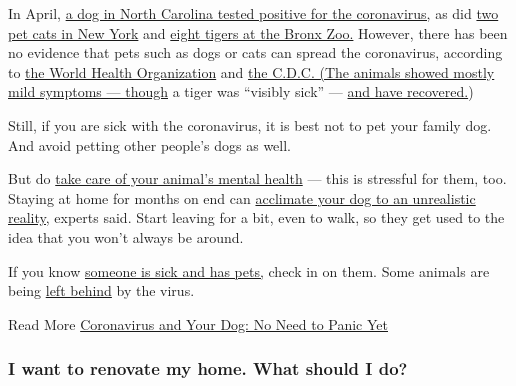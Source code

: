 In April,
\href{https://www.nytimes.com/2020/04/28/us/dog-coronavirus-positive-test.html}{a
dog in North Carolina tested positive for the coronavirus,} as did
\href{https://www.nytimes.com/2020/04/22/health/cats-pets-coronavirus.html}{two
pet cats in New York} and
\href{https://newsroom.wcs.org/News-Releases/articleType/ArticleView/articleId/14084/Update-Bronx-Zoo-Tigers-and-Lions-Recovering-from-COVID-19.aspx}{eight
tigers at the Bronx Zoo.} However, there has been no evidence that pets
such as dogs or cats can spread the coronavirus, according to
\href{https://www.who.int/docs/default-source/inaugural-who-partners-forum/coronavirus-poster-english-srilanka.pdf?sfvrsn=289dedc3_0}{the
World Health Organization} and
\href{https://www.cdc.gov/coronavirus/2019-ncov/daily-life-coping/animals.html?CDC_AA_refVal=https\%3A\%2F\%2Fwww.cdc.gov\%2Fcoronavirus\%2F2019-ncov\%2Fprepare\%2Fanimals.html}{the
C.D.C. (The animals showed mostly mild symptoms --- though} a tiger was
``visibly sick'' ---
\href{https://www.cdc.gov/coronavirus/2019-ncov/daily-life-coping/animals.html?CDC_AA_refVal=https\%3A\%2F\%2Fwww.cdc.gov\%2Fcoronavirus\%2F2019-ncov\%2Fprepare\%2Fanimals.html}{and
have recovered.})

Still, if you are sick with the coronavirus, it is best not to pet your
family dog. And avoid petting other people's dogs as well.

But do
\href{https://www.nytimes.com/2020/04/21/well/coronavirus-pet-care-grooming.html}{take
care of your animal's mental health} --- this is stressful for them,
too. Staying at home for months on end can
\href{https://www.nytimes.com/2020/05/27/smarter-living/how-to-prepare-your-dog-to-be-left-at-home-alone-again.html}{acclimate
your dog to an unrealistic reality,} experts said. Start leaving for a
bit, even to walk, so they get used to the idea that you won't always be
around.

If you know
\href{https://www.nytimes.com/2020/04/19/world/europe/coronavirus-spain-pets.html}{someone
is sick and has pets,} check in on them. Some animals are being
\href{https://www.nytimes.com/2020/06/23/nyregion/coronavirus-pets.html}{left
behind} by the virus.

 Read More
\href{https://www.nytimes.com/2020/03/04/science/animals-pets-coronavirus.html}{Coronavirus
and Your Dog: No Need to Panic Yet}

\hypertarget{i-want-to-renovate-my-home-what-should-i-do}{%
\subsubsection{I want to renovate my home. What should I
do?}\label{i-want-to-renovate-my-home-what-should-i-do}}

